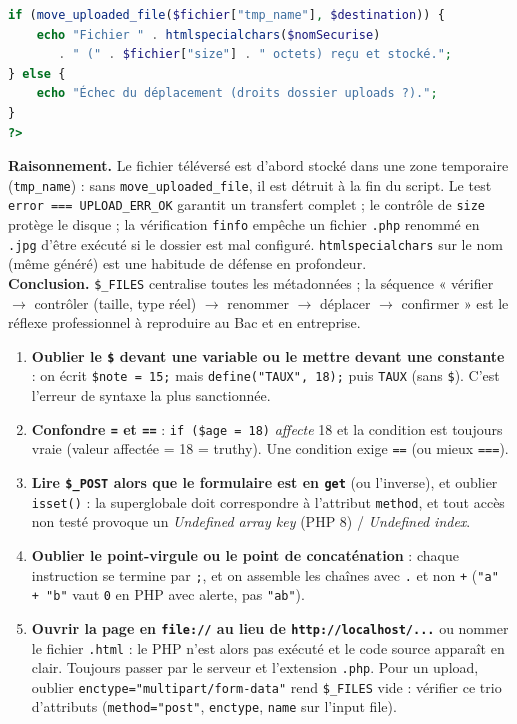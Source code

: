 \documentclass[11pt]{article}
\begin{document}
\begin{exoresolu}
\begin{lstlisting}[language=Php]
if (move_uploaded_file($fichier["tmp_name"], $destination)) {
    echo "Fichier " . htmlspecialchars($nomSecurise) 
       . " (" . $fichier["size"] . " octets) reçu et stocké.";
} else {
    echo "Échec du déplacement (droits dossier uploads ?).";
}
?>
\end{lstlisting}
\textbf{Raisonnement.} Le fichier téléversé est d'abord stocké dans une zone temporaire (\texttt{tmp\_name}) : sans \texttt{move\_uploaded\_file}, il est détruit à la fin du script. Le test \texttt{error === UPLOAD\_ERR\_OK} garantit un transfert complet ; le contrôle de \texttt{size} protège le disque ; la vérification \texttt{finfo} empêche un fichier \texttt{.php} renommé en \texttt{.jpg} d'être exécuté si le dossier est mal configuré. \texttt{htmlspecialchars} sur le nom (même généré) est une habitude de défense en profondeur.\\
\textbf{Conclusion.} \texttt{\$\_FILES} centralise toutes les métadonnées ; la séquence « vérifier $\rightarrow$ contrôler (taille, type réel) $\rightarrow$ renommer $\rightarrow$ déplacer $\rightarrow$ confirmer » est le réflexe professionnel à reproduire au Bac et en entreprise.
\end{exoresolu}

\begin{attention}
\begin{enumerate}
  \item \textbf{Oublier le \texttt{\$} devant une variable ou le mettre devant une constante} : on écrit \texttt{\$note = 15;} mais \texttt{define("TAUX", 18);} puis \texttt{TAUX} (sans \texttt{\$}). C'est l'erreur de syntaxe la plus sanctionnée.
  \item \textbf{Confondre \texttt{=} et \texttt{==}} : \texttt{if (\$age = 18)} \emph{affecte} 18 et la condition est toujours vraie (valeur affectée = 18 = truthy). Une condition exige \texttt{==} (ou mieux \texttt{===}).
  \item \textbf{Lire \texttt{\$\_POST} alors que le formulaire est en \texttt{get}} (ou l'inverse), et oublier \texttt{isset()} : la superglobale doit correspondre à l'attribut \texttt{method}, et tout accès non testé provoque un \emph{Undefined array key} (PHP 8) / \emph{Undefined index}.
  \item \textbf{Oublier le point-virgule ou le point de concaténation} : chaque instruction se termine par \texttt{;}, et on assemble les chaînes avec \texttt{.} et non \texttt{+} (\texttt{"a" + "b"} vaut \texttt{0} en PHP avec alerte, pas \texttt{"ab"}).
  \item \textbf{Ouvrir la page en \texttt{file://} au lieu de \texttt{http://localhost/...}} ou nommer le fichier \texttt{.html} : le PHP n'est alors pas exécuté et le code source apparaît en clair. Toujours passer par le serveur et l'extension \texttt{.php}. Pour un upload, oublier \texttt{enctype="multipart/form-data"} rend \texttt{\$\_FILES} vide : vérifier ce trio d'attributs (\texttt{method="post"}, \texttt{enctype}, \texttt{name} sur l'input file).
\end{enumerate}
\end{attention}
\end{document}
